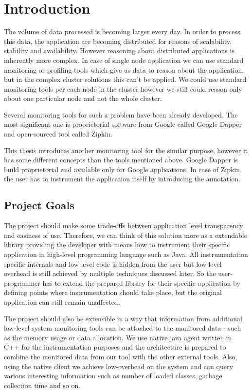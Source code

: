 \chapter{Introduction}
The volume of data processed is becoming larger every day. In order to process this data, the application are becoming distributed for reasons of scalability, stability and availability. However reasoning about distributed applications is inherently more complex. In case of single node application we can use standard monitoring or profiling tools which give us data to reason about the application, but in the complex cluster solutions this can't be applied. We could use standard monitoring tools per each node in the cluster however we still could reason only about one particular node and not the whole cluster.

Several monitoring tools for such a problem have been already developed. The most significant one is proprietorial software from Google called Google Dapper and open-sourced tool called Zipkin.

This thesis introduces another monitoring tool for the similar purpose, however it has some different concepts than the tools mentioned above. Google Dapper is build proprietorial and available only for Google applications. In case of Zipkin, the user has to instrument the application itself by introducing the annotation. 

\section{Project Goals}
The project should make some trade-offs between application level transparency and easiness of use. Therefore, we can think of this solution more as a extendable library providing the developer with means how to instrument their specific application in high-level programming language such as Java. All instrumentation specific internals and low-level code is hidden from the user but low-level overhead is still achieved by multiple techniques discussed later. So the user-programmer has to extend the prepared library for their specific application by defining points where instrumentation should take place, but the original application can still remain unaffected.

The project should also be extensible in a way that information from additional low-level system monitoring tools can be attached to the monitored data - such as the memory usage or data allocation. We use  native java agent written in C++ for the instrumentation purposes and the architecture is prepared to combine the monitored data from our tool with the other external tools.  Also, using the native client we achieve low-overhead on the system and can query various interesting information such as number of loaded classes, garbage collection time and so on. 

